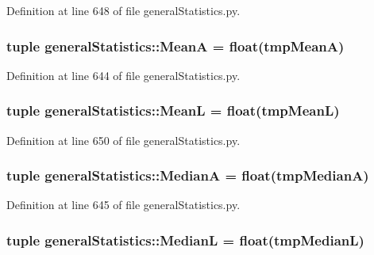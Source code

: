 \-Definition at line 648 of file general\-Statistics.\-py.

\hypertarget{namespacegeneral_statistics_a7401b301b0d33e936b080290d6c24800}{
\subsubsection[{\-Mean\-A}]{\setlength{\rightskip}{0pt plus 5cm}tuple {\bf general\-Statistics\-::\-Mean\-A} = float(tmp\-Mean\-A)}}\label{namespacegeneral_statistics_a7401b301b0d33e936b080290d6c24800}


\-Definition at line 644 of file general\-Statistics.\-py.

\hypertarget{namespacegeneral_statistics_ab88669192815a1e37e03baefc3417e75}{
\subsubsection[{\-Mean\-L}]{\setlength{\rightskip}{0pt plus 5cm}tuple {\bf general\-Statistics\-::\-Mean\-L} = float(tmp\-Mean\-L)}}\label{namespacegeneral_statistics_ab88669192815a1e37e03baefc3417e75}


\-Definition at line 650 of file general\-Statistics.\-py.

\hypertarget{namespacegeneral_statistics_ab5588d21a923247b4daefa52d179fca5}{
\subsubsection[{\-Median\-A}]{\setlength{\rightskip}{0pt plus 5cm}tuple {\bf general\-Statistics\-::\-Median\-A} = float(tmp\-Median\-A)}}\label{namespacegeneral_statistics_ab5588d21a923247b4daefa52d179fca5}


\-Definition at line 645 of file general\-Statistics.\-py.

\hypertarget{namespacegeneral_statistics_a3c165f47efb809460b0169ceb049ed52}{
\subsubsection[{\-Median\-L}]{\setlength{\rightskip}{0pt plus 5cm}tuple {\bf general\-Statistics\-::\-Median\-L} = float(tmp\-Median\-L)}}\label{namespacegeneral_statistics_a3c165f47efb809460b0169ceb049ed52}


